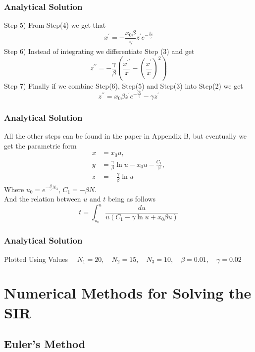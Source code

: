 \documentclass{beamer}
\begin{document}
\begin{frame}\frametitle{Analytical Solution}
    Step 5) From Step(4) we get that 
    \begin{equation*} 
        x^{\prime} = -\frac{x_{0}\beta}{\gamma} z^{\prime} e^{-\frac{\beta z}{\gamma}}
    \end{equation*}
    Step 6) Instead of integrating we differentiate Step (3) and get
    \begin{equation*}
        z^{\prime\prime} = -\frac{\gamma}{\beta}\left(\frac{x^{\prime\prime}}{x} - \left(\frac{x^{\prime}}{x}\right)^{2} \right)
    \end{equation*}
    Step 7) Finally if we combine Step(6), Step(5) and Step(3) into Step(2) we get
    \begin{equation*}
        z^{\prime\prime} = x_{0} \beta z^{\prime} e^{-\frac{\beta z}{\gamma}} - \gamma z^{\prime}
    \end{equation*}
\end{frame}

\begin{frame}\frametitle{Analytical Solution}
    All the other steps can be found in the paper in Appendix B, but eventually we get the parametric form
    \begin{align*}
        x &= x_0u,\\
        y &= \frac{\gamma}{\beta}\ln u - x_0u - \frac{C_1}{\beta},\\
        z &= -\frac{\gamma}{\beta}\ln u
    \end{align*}
Where $u_0 = e^{-\frac{\beta}{\gamma}N_3}$, $C_1 = -\beta N$.\\
And the relation between $u$ and $t$ being as follows
\begin{equation*} 
	t = \int_{u_0}^{u} \frac{du}{u(C_1-\gamma \ln u + x_0\beta u)}
\end{equation*}
\end{frame}
\begin{frame}\frametitle{Analytical Solution}

    Plotted Using Values$\quad$ $N_1=20, \quad N_2=15, \quad N_3=10, \quad \beta = 0.01, \quad \gamma = 0.02$
\end{frame}



\section{Numerical Methods for Solving the SIR}
\subsection{Euler's Method}
\end{document}
